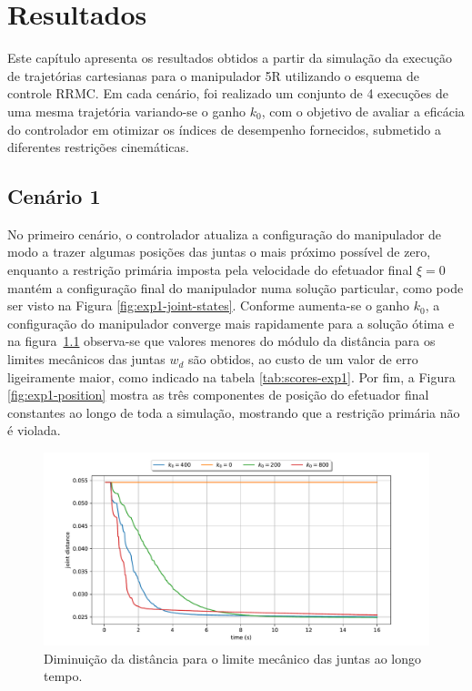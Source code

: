 \chapter{Resultados}\label{cap:results}

Este capítulo apresenta os resultados obtidos a partir da simulação da 
execução de trajetórias cartesianas para o manipulador 5R utilizando o esquema 
de controle RRMC. Em cada cenário, foi realizado um conjunto de 4 execuções de 
uma mesma trajetória variando-se o ganho \(k_0\), com o objetivo de avaliar 
a eficácia do controlador em otimizar os índices de desempenho fornecidos, submetido 
a diferentes restrições cinemáticas.

\section{Cenário 1}

No primeiro cenário, o controlador atualiza a configuração do manipulador de modo a trazer algumas posições 
das juntas o mais próximo possível de zero, enquanto a restrição primária imposta pela velocidade 
do efetuador final \(\xi = 0\) mantém a configuração final do manipulador numa solução particular, 
como pode ser visto na Figura \ref*{fig:exp1-joint-states}. Conforme aumenta-se o ganho \(k_0\), a 
configuração do manipulador converge mais rapidamente para a solução ótima e na figura~\ref*{fig:exp1-metric}
observa-se que valores menores do módulo da distância para os limites mecânicos das juntas \(w_d\) são obtidos, ao custo 
de um valor de erro ligeiramente maior, como indicado na tabela \ref*{tab:scores-exp1}. Por fim, a Figura 
\ref*{fig:exp1-position} mostra as três componentes de posição do efetuador final constantes ao longo de toda a simulação, 
mostrando que a restrição primária não é violada.

\begin{figure}
	\centering
	\includegraphics[width=\textwidth]{./Images/2024-06-11-09-23-42/metric_joint_distance.pdf}
	\caption{Diminuição da distância para o limite mecânico das juntas ao longo tempo.}\label{fig:exp1-metric}
\end{figure}

